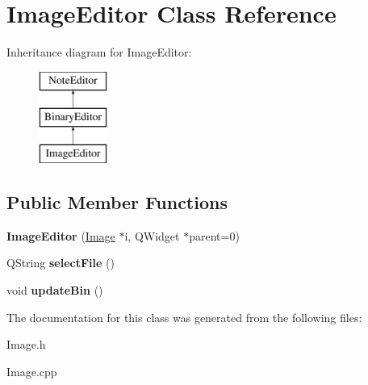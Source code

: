 \hypertarget{classImageEditor}{\section{\-Image\-Editor \-Class \-Reference}
\label{classImageEditor}
}
\-Inheritance diagram for \-Image\-Editor\-:\begin{figure}[H]
\begin{center}
\leavevmode
\includegraphics[height=3.000000cm]{classImageEditor}
\end{center}
\end{figure}
\subsection*{\-Public \-Member \-Functions}
\begin{DoxyCompactItemize}
\item 
\hypertarget{classImageEditor_aad6362364edd121eb9078d9bea3afcea}{{\bfseries \-Image\-Editor} (\hyperlink{classImage}{\-Image} $\ast$i, \-Q\-Widget $\ast$parent=0)}\label{classImageEditor_aad6362364edd121eb9078d9bea3afcea}

\item 
\hypertarget{classImageEditor_a8c88f3e1532823b747da313c9c210c2b}{\-Q\-String {\bfseries select\-File} ()}\label{classImageEditor_a8c88f3e1532823b747da313c9c210c2b}

\item 
\hypertarget{classImageEditor_a68ed4fb140109f5d81ce807adef5720e}{void {\bfseries update\-Bin} ()}\label{classImageEditor_a68ed4fb140109f5d81ce807adef5720e}

\end{DoxyCompactItemize}


\-The documentation for this class was generated from the following files\-:\begin{DoxyCompactItemize}
\item 
\-Image.\-h\item 
\-Image.\-cpp\end{DoxyCompactItemize}
